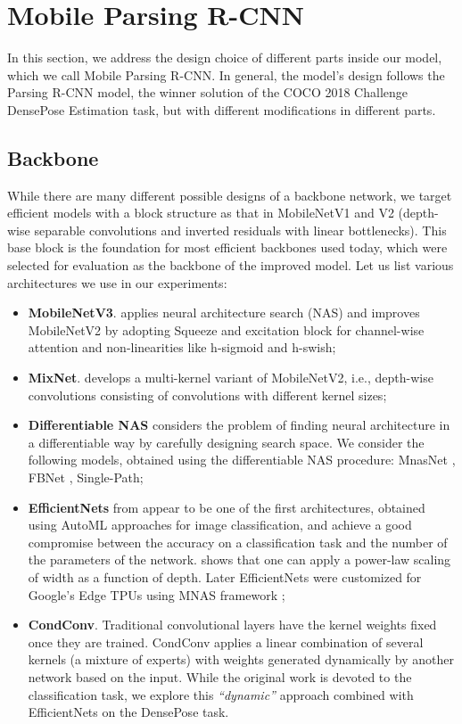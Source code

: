 \section{Mobile Parsing R-CNN}
\label{section3}

In this section, we address the design choice of different parts inside our model, which we call Mobile Parsing R-CNN. In general, the model's design follows the Parsing R-CNN model, the winner solution of the COCO 2018 Challenge DensePose Estimation task, but with different modifications in different parts.

\subsection{Backbone}

While there are many different possible designs of a backbone network, we target efficient models with a block structure as that in MobileNetV1 and V2 \cite{mobilenetv1, mobilenetv2} (depth-wise separable convolutions and inverted residuals with linear bottlenecks). This base block is the foundation for most efficient backbones used today, which were selected for evaluation as the backbone of the improved model. 
Let us list various architectures we use in our experiments:
\begin{itemize}
    \item \textbf{MobileNetV3}.  \cite{mobilenetv3} applies neural architecture search (NAS) and improves MobileNetV2 by adopting Squeeze and excitation block for channel-wise attention and non-linearities like h-sigmoid and h-swish;
    \item \textbf{MixNet}. \cite{mixnet} develops a multi-kernel variant of MobileNetV2, i.e., depth-wise convolutions consisting of convolutions with different kernel sizes;
    \item \textbf{Differentiable NAS} considers the problem of finding neural architecture in a differentiable way by carefully designing search space. We consider the following models, obtained using the differentiable NAS procedure: MnasNet \cite{mnasnet}, FBNet \cite{fbnet}, Single-Path\cite{spnasnet};
    \item \textbf{EfficientNets} from \cite{efficientnetb} appear to be one of the first architectures, obtained using AutoML approaches for image classification, and achieve a good compromise between the accuracy on a classification task and the number of the parameters of the network. \cite{efficientnetb} shows that one can apply a power-law scaling of width as a function of depth. Later EfficientNets were customized for Google's Edge TPUs \cite{efficientnete} using MNAS framework \cite{mnasnet};
    \item \textbf{CondConv}. Traditional convolutional layers have the kernel weights fixed once they are trained. CondConv \cite{condconv} applies a linear combination of several kernels (a mixture of experts) with weights generated dynamically by another network based on the input. While the original work is devoted to the classification task, we explore this \textit{``dynamic''} approach combined with EfficientNets on the DensePose task.
\end{itemize}

